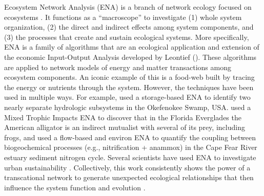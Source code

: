 \documentclass[11pt]{article}
\begin{document}
\begin{spacing}{2}
Ecosystem Network Analysis (ENA) is a branch of network ecology
focused on ecosystems \citep{ulanowicz86, fath99_review,
  borrett12_netecol}.  It functions as a ``macroscope'' to investigate
(1) whole system organization, (2) the direct and indirect effects
among system components, and (3) the processes that create and sustain
ecological systems.  More specifically, ENA is a family of algorithms
that are an ecological application and extension of the economic
Input-Output Analysis developed by Leontief (\citeyear{leontief66}).
These algorithms are applied to network models of energy and matter
transactions among ecosystem components.  An iconic example of this is
a food-web built by tracing the energy or nutrients through the
system.  However, the techniques have been used in multiple ways.  For
example, \citet{patten82} used a storage-based ENA to identify two
nearly separate hydrologic subsystems in the Okefenokee Swamp, USA.
\citet{bondavalli99} used a Mixed Trophic Impacts ENA to discover that
in the Florida Everglades the American alligator is an indirect
mutualist with several of its prey, including frogs, and
\citet{hines12} used a flow-based and environ ENA to quantify the
coupling between biogeochemical processes (e.g., nitrification +
anammox) in the Cape Fear River estuary sediment nitrogen cycle.
Several scientists have used ENA to investigate urban sustainability
\citep{bodini02, zhang10_ecomod, chen12, bodini2012cities}.
Collectively, this work consistently shows the power of a transcational
network to generate unexpected ecological relationships that then
influence the system function and evolution \citep{ulanowicz97,
  patten91, jorgensen07_newecology}.


\end{spacing}
\end{document}
